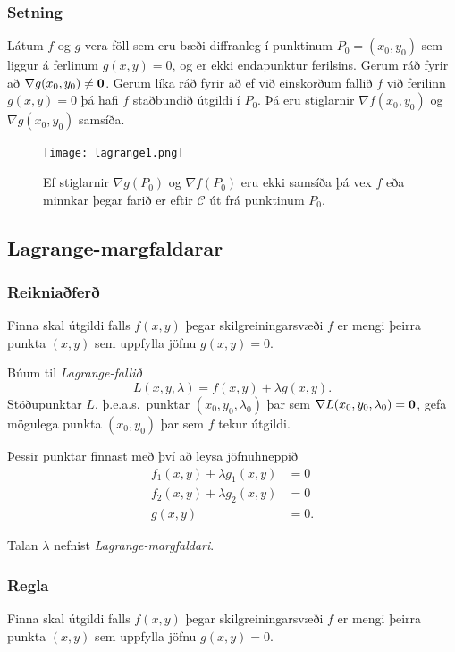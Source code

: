 \subsubsection{Setning  }
Látum $f$ og $g$ vera föll sem eru bæði
diffranleg í punktinum $P_0=(x_0,y_0)$ sem liggur á ferlinum
$g(x,y)=0$, og er ekki endapunktur ferilsins.  Gerum ráð fyrir að
$\nabla g(x_0,y_0)\neq \mbox{${\bf 0}$}$.  Gerum líka ráð fyrir að ef við einskorðum fallið $f$ við ferilinn $g(x,y)=0$ þá hafi $f$ staðbundið útgildi í $P_0$.  Þá eru stiglarnir $\nabla f(x_0,y_0)$ og $\nabla g(x_0,y_0)$ samsíða.


\begin {figure}[h!]
 \centering
            \texttt{[image: lagrange1.png]}
            \caption*{Ef stiglarnir $\nabla g(P_0)$ og $\nabla f(P_0)$ eru ekki samsíða þá vex $f$ eða minnkar þegar farið er eftir $\mathcal{C}$ út frá punktinum $P_0$.}
\end {figure}



\subsection{Lagrange-margfaldarar} 

\subsubsection{Reikniaðferð  }
  Finna skal útgildi falls $f(x,y)$ þegar skilgreiningarsvæði $f$ er mengi þeirra punkta $(x,y)$ sem uppfylla jöfnu $g(x,y)=0$.  

\medskip
Búum til {\em Lagrange-fallið}
$$L(x,y,\lambda)=f(x,y)+\lambda g(x,y).$$
Stöðupunktar $L$, þ.e.a.s.~punktar $(x_0,y_0,\lambda_0)$ þar sem $\nabla L(x_0,y_0,\lambda_0)=\mbox{${\bf 0}$}$, gefa mögulega punkta $(x_0,y_0)$ þar sem $f$ tekur útgildi.

\medskip
Þessir punktar finnast með því að leysa jöfnuhneppið
\begin{align*}
f_1(x,y)+\lambda g_1(x,y)&=0\\
f_2(x,y)+\lambda g_2(x,y)&=0\\
g(x,y)&=0.
\end{align*}

Talan $\lambda$ nefnist \emph{Lagrange-margfaldari}.



\subsubsection{Regla  }
Finna skal útgildi falls $f(x,y)$ þegar skilgreiningarsvæði $f$ er mengi þeirra punkta $(x,y)$ sem uppfylla jöfnu $g(x,y)=0$.  

